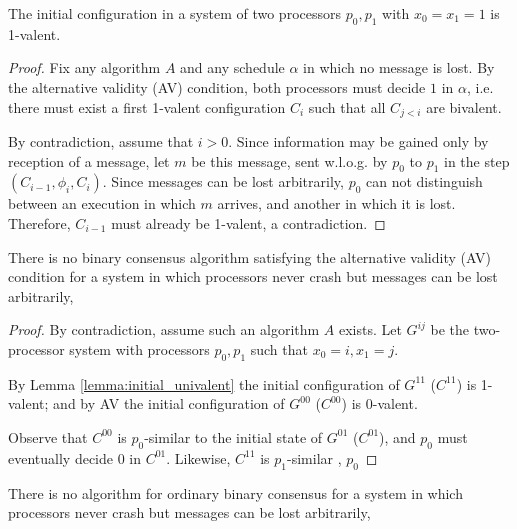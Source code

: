 \begin{lemma} \label{lemma:initial_univalent}
The initial configuration in a system of two processors $p_0, p_1$ with $x_0 = x_1 = 1$
is 1-valent.
\end{lemma}


\begin{proof}
Fix any algorithm $A$ and any schedule $\alpha$ in which no message is lost.
By the alternative validity (AV) condition, both processors must decide $1$
in $\alpha$, i.e. there must exist a first 1-valent configuration $C_i$
such that all $C_{j < i}$ are bivalent.

By contradiction, assume that $i > 0$.
Since information may be gained only by reception of a message,
let $m$ be this message, sent w.l.o.g. by $p_0$ to $p_1$ in the step 
$(C_{i-1}, \phi_i, C_i)$. Since messages can be lost arbitrarily, $p_0$
can not distinguish between an execution in which $m$ arrives, and another
in which it is lost. Therefore, $C_{i-1}$ must already be 1-valent, a
contradiction.
\end{proof}

\begin{theorem} \label{thm:no_av_consensus}
There is no binary consensus algorithm satisfying the alternative validity (AV)
condition for a system in which processors never crash but messages can be
lost arbitrarily,
\end{theorem}

\begin{proof}
By contradiction, assume such an algorithm $A$ exists.
Let $G^{ij}$ be the two-processor system with processors
$p_0, p_1$ such that $x_0 = i, x_1 = j$.

By Lemma \ref{lemma:initial_univalent} the initial configuration of
$G^{11}$ ($C^{11}$) is 1-valent; and by AV the initial configuration
of $G^{00}$ ($C^{00}$) is 0-valent.

Observe that $C^{00}$ is $p_0$-similar to the initial state of
$G^{01}$ ($C^{01}$), and $p_0$ must eventually decide 0 in $C^{01}$.
Likewise, $C^{11}$ is $p_1$-similar , $p_0$ 
\end{proof}

\begin{theorem}
There is no algorithm for ordinary binary consensus
for a system in which processors never crash but messages can be
lost arbitrarily,
\end{theorem}

